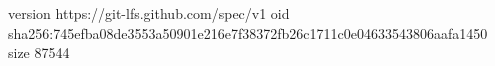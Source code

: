 version https://git-lfs.github.com/spec/v1
oid sha256:745efba08de3553a50901e216e7f38372fb26c1711c0e04633543806aafa1450
size 87544
